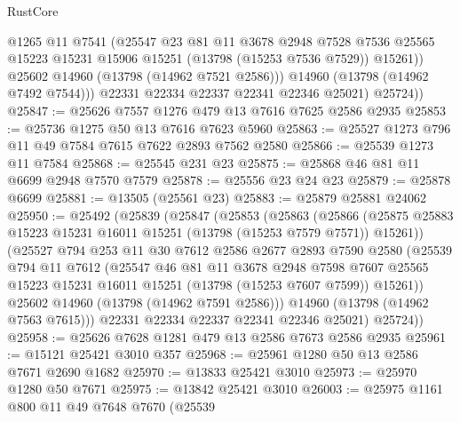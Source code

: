 \begin{lexlean}{RustCore}
\begin{coremodule}
                @1265
                @11
                @7541
                (@25547
                  @23
                  @81
                  @11
                  @3678
                  @2948
                  @7528
                  @7536
                  @25565
                  @15223
                  @15231
                  @15906
                  @15251
                  (@13798 (@15253 @7536 @7529))
                  @15261))
              @25602
              @14960
              (@13798 (@14962 @7521 @2586)))
            @14960
            (@13798 (@14962 @7492 @7544)))
          @22331
          @22334
          @22337
          @22341
          @22346
          @25021)
        @25724))
@25847 := @25626 @7557 @1276 @479 @13 @7616 @7625 @2586 @2935
@25853 := @25736 @1275 @50 @13 @7616 @7623 @5960
@25863 := @25527 @1273 @796 @11 @49 @7584 @7615 @7622 @2893 @7562 @2580
@25866 := @25539 @1273 @11 @7584
@25868 := @25545 @231 @23
@25875 := @25868 @46 @81 @11 @6699 @2948 @7570 @7579
@25878 := @25556 @23 @24 @23
@25879 := @25878 @6699
@25881 := @13505 (@25561 @23)
@25883 := @25879 @25881 @24062
@25950 := @25492
    (@25839
      (@25847
        (@25853
          (@25863
            (@25866
              (@25875 @25883 @15223 @15231 @16011 @15251 (@13798 (@15253 @7579 @7571)) @15261))
            (@25527
              @794
              @253
              @11
              @30
              @7612
              @2586
              @2677
              @2893
              @7590
              @2580
              (@25539
                @794
                @11
                @7612
                (@25547
                  @46
                  @81
                  @11
                  @3678
                  @2948
                  @7598
                  @7607
                  @25565
                  @15223
                  @15231
                  @16011
                  @15251
                  (@13798 (@15253 @7607 @7599))
                  @15261))
              @25602
              @14960
              (@13798 (@14962 @7591 @2586)))
            @14960
            (@13798 (@14962 @7563 @7615)))
          @22331
          @22334
          @22337
          @22341
          @22346
          @25021)
        @25724))
@25958 := @25626 @7628 @1281 @479 @13 @2586 @7673 @2586 @2935
@25961 := @15121 @25421 @3010 @357
@25968 := @25961 @1280 @50 @13 @2586 @7671 @2690 @1682
@25970 := @13833 @25421 @3010
@25973 := @25970 @1280 @50 @7671
@25975 := @13842 @25421 @3010
@26003 := @25975
    @1161
    @800
    @11
    @49
    @7648
    @7670
    (@25539

\end{coremodule}
\end{lexlean}
